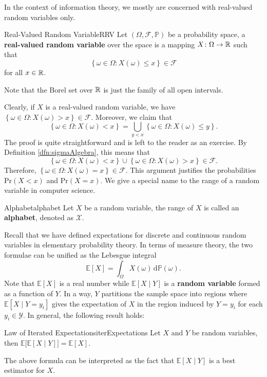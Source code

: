 \documentclass[math, code]{amznotes}
\theoremstyle{remark}
\renewcommand{\d}{\mathrm{d}}
\begin{document}
In the context of information theory, we mostly are concerned with real-valued random variables only.
\begin{dfnbox}{Real-Valued Random Variable}{RRV}
    Let $\left(\Omega, \mathcal{F}, \mathbb{P}\right)$ be a probability space, a {\color{red} \textbf{real-valued random variable}} over the space is a mapping $X \colon \Omega \to \mathbb{R}$ such that 
    \begin{equation*}
        \left\{\omega \in \Omega \colon X\left(\omega\right) \leq x\right\} \in \mathcal{F}
    \end{equation*}
    for all $x \in \mathbb{R}$.
\end{dfnbox}
Note that the Borel set over $\mathbb{R}$ is just the family of all open intervals. 

Clearly, if $X$ is a real-valued random variable, we have $\left\{\omega \in \Omega \colon X\left(\omega\right) > x\right\} \in \mathcal{F}$. Moreover, we claim that 
\begin{equation*}
    \left\{\omega \in \Omega \colon X\left(\omega\right) < x\right\} = \bigcup_{y < x}\left\{\omega \in \Omega \colon X\left(\omega\right) \leq y\right\}.
\end{equation*}
The proof is quite straightforward and is left to the reader as an exercise. By Definition \ref{dfn:sigmaAlgebra}, this means that 
\begin{equation*}
    \left\{\omega \in \Omega \colon X\left(\omega\right) < x\right\} \cup \left\{\omega \in \Omega \colon X\left(\omega\right) > x\right\} \in \mathcal{F}.
\end{equation*}
Therefore, $\left\{\omega \in \Omega \colon X\left(\omega\right) = x\right\} \in \mathcal{F}$. This argument justifies the probabilities $\mathrm{Pr}\left(X < x\right)$ and $\mathrm{Pr}\left(X = x\right)$. We give a special name to the range of a random variable in computer science.
\begin{dfnbox}{Alphabet}{alphabet}
    Let $X$ be a random variable, the range of $X$ is called an {\color{red} \textbf{alphabet}}, denoted as $\mathcal{X}$.
\end{dfnbox}
Recall that we have defined expectations for discrete and continuous random variables in elementary probability theory. In terms of measure theory, the two formulae can be unified as the Lebesgue integral
\begin{equation*}
    \mathbb{E}[X] = \int_{\Omega}\!X\left(\omega\right)\,\d\mathbb{P}\left(\omega\right).
\end{equation*}
Note that $\mathbb{E}[X]$ is a real number while $\mathbb{E}[X \mid Y]$ is a \textbf{random variable} formed as a function of $Y$. In a way, $Y$ partitions the sample space into regions where $\mathbb{E}[X \mid Y = y_i]$ gives the expectation of $X$ in the region induced by $Y = y_i$ for each $y_i \in \mathcal{Y}$. In general, the following result holds:
\begin{thmbox}{Law of Iterated Expectations}{iterExpectations}
    Let $X$ and $Y$ be random variables, then $\mathbb{E}\bigl[\mathbb{E}[X \mid Y]\bigr] = \mathbb{E}[X]$.
\end{thmbox}
The above formula can be interpreted as the fact that $\mathbb{E}[X \mid Y]$ is a best estimator for $X$.
\end{document}

